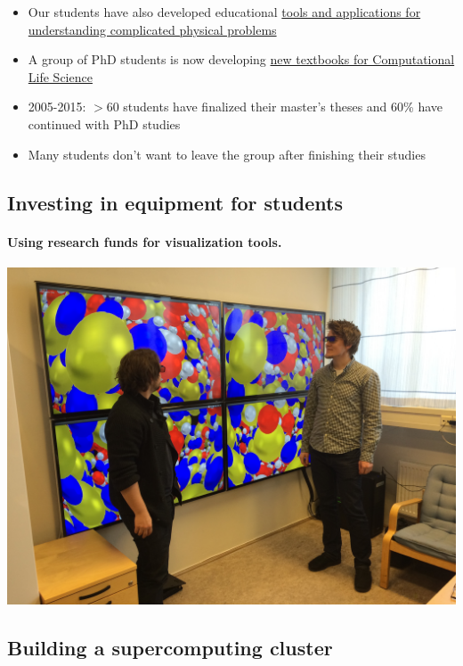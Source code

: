 \documentclass[%
<<<<<<< HEAD
oneside,                 %
final,                   %
=======
twoside,                 %
final,                   %
>>>>>>> 5fc06d357468ca5ec59d2d3ed0179709275f8f00
10pt]{article}
\begin{document}
\begin{itemize}
\begin{itemize}
\item Our students have also developed educational \href{{http://www.mn.uio.no/fysikk/om/aktuelt/aktuelle-saker/2015/realfagsapper.html}}{tools and applications for understanding complicated physical problems}

\item A group of PhD students is now developing \href{{https://github.com/CINPLA/ibvcse}}{new textbooks for Computational Life Science}

\item 2005-2015: $> 60$ students have finalized their master's theses and 60\% have continued with PhD studies

\item Many students don't want to leave the group after finishing their studies
\end{itemize}

\noindent






\subsection*{Investing in equipment for students}

\paragraph{Using research funds for visualization tools.}


\centerline{\includegraphics[width=0.7\linewidth]{fig-future/visualize.jpg}}




\subsection*{Building a supercomputing cluster}


\end{itemize}
\end{document}

